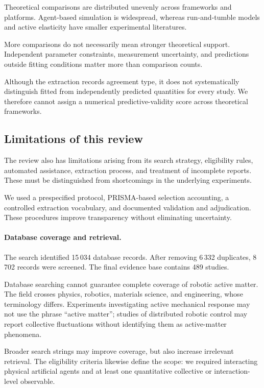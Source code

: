 Theoretical comparisons are distributed
unevenly across frameworks and platforms.
Agent-based simulation is widespread,
whereas run-and-tumble models and
active elasticity have smaller
experimental literatures.

More comparisons do not necessarily
mean stronger theoretical support.
Independent parameter constraints,
measurement uncertainty, and
predictions outside fitting conditions
matter more than comparison counts.

Although the extraction records
agreement type, it does not
systematically distinguish fitted
from independently predicted
quantities for every study.
We therefore cannot assign
a numerical predictive-validity
score across theoretical frameworks.

\subsection{Limitations of this review}
\label{sec:discussion-review-limitations}

The review also has limitations arising from its
search strategy, eligibility rules, automated
assistance, extraction process, and treatment
of incomplete reports. These must be distinguished
from shortcomings in the underlying experiments.

We used a prespecified protocol,
PRISMA-based selection accounting,
a controlled extraction vocabulary,
and documented validation and adjudication.
These procedures improve transparency
without eliminating uncertainty.

\paragraph*{Database coverage and retrieval.}

The search identified 15\,034 database records.
After removing 6\,332 duplicates,
8\,702 records were screened.
The final evidence base contains 489 studies.

Database searching cannot guarantee complete
coverage of robotic active matter. The field
crosses physics, robotics, materials science,
and engineering, whose terminology differs.
Experiments investigating active mechanical
response may not use the phrase ``active matter'';
studies of distributed robotic control may
report collective fluctuations without identifying
them as active-matter phenomena.

Broader search strings may improve coverage,
but also increase irrelevant retrieval.
The eligibility criteria likewise define
the scope: we required interacting physical
artificial agents and at least one quantitative
collective or interaction-level observable.

